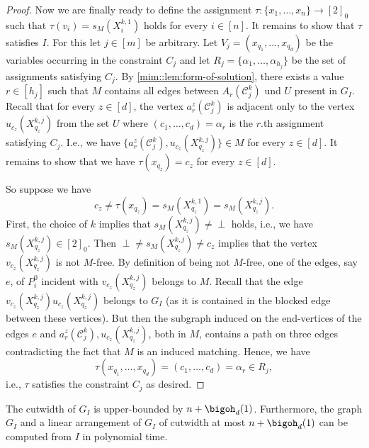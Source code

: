 \documentclass[a4paper,UKenglish,cleveref, autoref, thm-restate]{lipics-v2021}
\begin{document}
\begin{proof}
    
    Now we are finally ready to define the assignment $\tau \colon \{x_1, \dots, x_n\} \to [2]_0$ such that $\tau(v_i)=s_M(X_i^{k,1})$ holds for every  $i\in[n]$. 
    It remains to show that $\tau$ satisfies $I$.
    For this let $j \in [m]$ be arbitrary.
    Let $V_j = (x_{q_1}, \dots, x_{q_d})$ be the variables occurring in the constraint $C_j$ and let $R_j = \{\alpha_1, \dots, \alpha_{h_j}\}$ be the set of assignments satisfying $C_j$.
    By \cref{mim::lem:form-of-solution}, there exists a value $r \in [h_j]$ such that $M$ contains all edges between $A_r(\mathcal{C}_j^k)$ und $U$ present in $G_I$.
    Recall that for every $z \in [d]$, the vertex $a_r^z(\mathcal{C}_j^k)$ is adjacent only to the vertex $u_{c_z}(X_{q_z}^{k,j})$ from the set $U$ where $(c_1, \dots, c_d) = \alpha_r$ is the $r$.th assignment satisfying $C_j$.
    I.e., we have $\{a_r^z(\mathcal{C}_j^k), u_{c_z}(X_{q_z}^{k,j})\} \in M$ for every $z \in [d]$.
    It remains to show that we have $\tau(x_{q_z}) = c_z$ for every $z \in [d]$.
    
    So suppose we have 
    \[
        c_z \neq \tau(x_{q_z}) = s_M(X_{q_z}^{k,1}) = s_M(X_{q_z}^{k,j}).
    \]
    First, the choice of $k$ implies that $s_M(X_{q_z}^{k,j}) \neq \perp$ holds, i.e., we have $s_M(X_{q_z}^{k,j}) \in [2]_0$.
    Then $\perp \neq s_M(X_{q_z}^{k,j}) \neq c_z$ implies that the vertex $v_{c_z}(X_{q_z}^{k,j})$ is not $M$-free.
    By definition of being not $M$-free, one of the edges, say $e$, of $P_i^0$ incident with $v_{c_z}(X_{q_z}^{k,j})$ belongs to $M$. 
    Recall that the edge $v_{c_z}(X_{q_z}^{k,j}) u_{c_z}(X_{q_z}^{k,j})$ belongs to $G_I$ (as it is contained in the blocked edge between these vertices).
    But then the subgraph induced on the end-vertices of the edges $e$ and $a_r^z(\mathcal{C}_j^k), u_{c_z}(X_{q_z}^{k,j})$, both in $M$, contains a path on three edges contradicting the fact that $M$ is an induced matching.
    Hence, we have 
    \[
        \tau(x_{q_1}, \dots, x_{q_d}) = (c_1, \dots, c_d) = \alpha_r \in R_j,
    \]
    i.e., $\tau$ satisfies the constraint $C_j$ as desired.
\end{proof}

\begin{lemma}\label{mim::lem:cutwidth}
    The cutwidth of $G_I$ is upper-bounded by $n+\bigoh_d(1)$. 
    Furthermore, the graph $G_I$ and a linear arrangement of $G_I$ of cutwidth at most $n+\bigoh_d(1)$ can be computed from $I$ in polynomial time.
\end{lemma}
\end{document}

